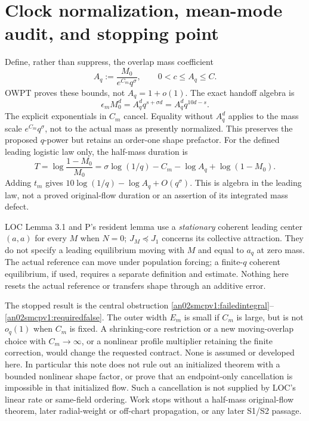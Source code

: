 \documentclass[11pt]{article}
\theoremstyle{remark}\newtheorem{remark}[theorem]{Remark}
\begin{document}
\section{Clock normalization, mean-mode audit, and stopping point}
Define, rather than suppress, the overlap mass coefficient
\begin{equation}\label{an02smcpv1:coefficient}
 A_q:=\frac{M_0}{e^{C_m}q^\sigma},\qquad 0<c\le A_q\le C.
\end{equation}
OWPT proves these bounds, not $A_q=1+o(1)$.
The exact handoff algebra is
\begin{equation}\label{an02smcpv1:handoff}
 \epsilon_mM_0^d=A_q^d q^{s+\sigma d}
 =A_q^d q^{10d-s}.
\end{equation}
The explicit exponentials in $C_m$ cancel. Equality without
$A_q^d$ applies to the mass scale $e^{C_m}q^\sigma$, not to the
actual mass as presently normalized. This preserves the proposed
$q$-power but retains an order-one shape prefactor.
For the defined leading logistic law only, the half-mass duration is
\begin{equation}\label{an02smcpv1:duration}
 T=\log\frac{1-M_0}{M_0}
 =\sigma\log(1/q)-C_m-\log A_q+\log(1-M_0).
\end{equation}
Adding $t_m$ gives $10\log(1/q)-\log A_q+O(q^\sigma)$.
This is algebra in the leading law, not a proved original-flow
duration or an assertion of its integrated mass defect.

LOC Lemma 3.1 and P's resident lemma use a \emph{stationary}
coherent leading center $(a,a)$ for every $M$ when $N=0$;
$J_M\preceq J_1$ concerns its collective attraction.
They do not specify a leading equilibrium moving with $M$ and
equal to $a_q$ at zero mass. The actual reference can move under
population forcing; a finite-$q$ coherent equilibrium, if used,
requires a separate definition and estimate. Nothing here resets
the actual reference or transfers shape through an additive error.

The stopped result is the central obstruction
\eqref{an02smcpv1:failedintegral}--\eqref{an02smcpv1:requiredfalse}.
The outer width $E_m$ is small if $C_m$ is large, but is not
$o_q(1)$ when $C_m$ is fixed. A shrinking-core restriction or
a new moving-overlap choice with $C_m\to\infty$, or a nonlinear
profile multiplier retaining the finite correction, would change
the requested contract. None is assumed or developed here.
In particular this note does not rule out an initialized theorem
with a bounded nonlinear shape factor, or prove that an endpoint-only
cancellation is impossible in that initialized flow. Such a
cancellation is not supplied by LOC's linear rate or same-field
ordering. Work stops without a half-mass original-flow theorem,
later radial-weight or off-chart propagation, or any later S1/S2
passage.
\end{document}
